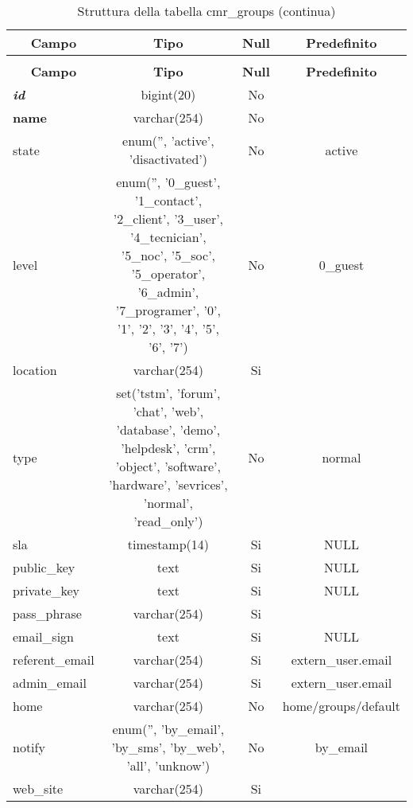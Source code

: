 %
%
 \begin{longtable}{|l|c|c|c|} 
 \caption{Struttura della tabella cmr\_groups} \label{tab:cmr_groups-structure} \\
 \hline \multicolumn{1}{|c|}{\textbf{Campo}} & \multicolumn{1}{|c|}{\textbf{Tipo}} & \multicolumn{1}{|c|}{\textbf{Null}} & \multicolumn{1}{|c|}{\textbf{Predefinito}} \\ \hline \hline
\endfirsthead
 \caption{Struttura della tabella cmr\_groups (continua)} \\ 
 \hline \multicolumn{1}{|c|}{\textbf{Campo}} & \multicolumn{1}{|c|}{\textbf{Tipo}} & \multicolumn{1}{|c|}{\textbf{Null}} & \multicolumn{1}{|c|}{\textbf{Predefinito}} \\ \hline \hline \endhead \endfoot \textbf{\textit{id}} & bigint(20) &  No  &  \\ \hline 
\textbf{name} & varchar(254) &  No  &  \\ \hline 
state & enum('', 'active', 'disactivated') &  No  & active \\ \hline 
level & enum('', '0\_guest', '1\_contact', '2\_client', '3\_user', '4\_tecnician', '5\_noc', '5\_soc', '5\_operator', '6\_admin', '7\_programer', '0', '1', '2', '3', '4', '5', '6', '7') &  No  & 0\_guest \\ \hline 
location & varchar(254) &  Si  &  \\ \hline 
type & set('tstm', 'forum', 'chat', 'web', 'database', 'demo', 'helpdesk', 'crm', 'object', 'software', 'hardware', 'sevrices', 'normal', 'read\_only') &  No  & normal \\ \hline 
sla & timestamp(14) &  Si  & NULL \\ \hline 
public\_key & text &  Si  & NULL \\ \hline 
private\_key & text &  Si  & NULL \\ \hline 
pass\_phrase & varchar(254) &  Si  &  \\ \hline 
email\_sign & text &  Si  & NULL \\ \hline 
referent\_email & varchar(254) &  Si  & extern\_user.email \\ \hline 
admin\_email & varchar(254) &  Si  & extern\_user.email \\ \hline 
home & varchar(254) &  No  & home/groups/default \\ \hline 
notify & enum('', 'by\_email', 'by\_sms', 'by\_web', 'all', 'unknow') &  No  & by\_email \\ \hline 
web\_site & varchar(254) &  Si  &  \\ \hline 

\end{longtable}
